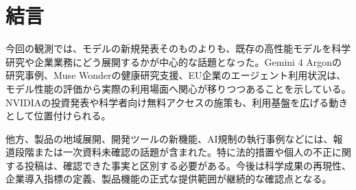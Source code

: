 \section*{結言}
今回の観測では、モデルの新規発表そのものよりも、既存の高性能モデルを科学研究や企業業務にどう展開するかが中心的な話題となった。Gemini 4 Argonの研究事例、Muse Wonderの健康研究支援、EU企業のエージェント利用状況は、モデル性能の評価から実際の利用場面へ関心が移りつつあることを示している。NVIDIAの投資発表や科学者向け無料アクセスの施策も、利用基盤を広げる動きとして位置付けられる。

他方、製品の地域展開、開発ツールの新機能、AI規制の執行事例などには、報道段階または一次資料未確認の話題が含まれた。特に法的措置や個人の不正に関する投稿は、確認できた事実と区別する必要がある。今後は科学成果の再現性、企業導入指標の定義、製品機能の正式な提供範囲が継続的な確認点となる。
